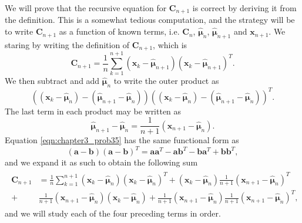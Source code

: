 \documentclass[12pt, a4paper]{article}
\newcommand{\vect}[1]{\bm{#1}}
\begin{document}
\begin{easylist}[enumerate]
We will prove that the recursive equation for $\vect{C}_{n+1}$ is correct by deriving it from the definition.
This is a somewhat tedious computation, and the strategy will be to write $\vect{C}_{n+1}$ as a function of known terms, i.e. $\vect{C}_{n}$, $\hat{\vect{\mu}}_n$, $\hat{\vect{\mu}}_{n+1}$ and $\vect{x}_{n+1}$.
We staring by writing the definition of $\vect{C}_{n+1}$, which is
\begin{equation*}
	\vect{C}_{n+1} = \frac{1}{n} \sum_{k=1}^{n+1} \left( \vect{x}_k - \hat{\vect{\mu}}_{n+1}\right) \left( \vect{x}_k - \hat{\vect{\mu}}_{n+1}\right)^T.
\end{equation*}
We then subtract and add $\hat{\vect{\mu}}_{n}$ to write the outer product as
\begin{equation}
\label{eqn:chapter3_prob35}
	\left( 
	\left( \vect{x}_k - \hat{\vect{\mu}}_{n}\right)
	- 
	\left( \hat{\vect{\mu}}_{n+1} - \hat{\vect{\mu}}_{n} \right)
	\right) 
	\left( 
	\left( \vect{x}_k - \hat{\vect{\mu}}_{n}\right)
	- 
	\left( \hat{\vect{\mu}}_{n+1} - \hat{\vect{\mu}}_{n} \right)
	\right) ^T.
\end{equation}
The last term in each product may be written as
\begin{equation*}
	\hat{\vect{\mu}}_{n+1} - \hat{\vect{\mu}}_{n} = \frac{1}{n +1} \left( \vect{x}_{n+1} -  \hat{\vect{\mu}}_{n} \right).
\end{equation*}
Equation \eqref{eqn:chapter3_prob35} has the same functional form as 
\begin{equation*}
(\vect{a} - \vect{b}) (\vect{a} - \vect{b})^T = \vect{a} \vect{a}^T - \vect{a} \vect{b}^T - \vect{b}\vect{a}^T + \vect{b} \vect{b}^T,
\end{equation*}
and we expand it as such to obtain the following sum
\begin{align}
\begin{split}
\label{eqn:eq3_problem35_2}
\vect{C}_{n+1} &= \frac{1}{n} \sum_{k=1}^{n+1}  
 \left( \vect{x}_k  - \hat{\vect{\mu}}_n \right)\left( \vect{x}_k  - \hat{\vect{\mu}}_n \right)^T 
+  \left( \vect{x}_{k}  - \hat{\vect{\mu}}_n \right) \frac{1}{n+1}\left( \vect{x}_{n+1} - \hat{\vect{\mu}}_n \right)^T \\
+ &   \frac{1}{n+1}\left( \vect{x}_{n+1} - \hat{\vect{\mu}}_n \right)   \left( \vect{x}_k  - \hat{\vect{\mu}}_n \right) 
+  \frac{1}{n+1}\left( \vect{x}_{n+1} - \hat{\vect{\mu}}_n \right) \frac{1}{n+1}\left( \vect{x}_{n+1} - \hat{\vect{\mu}}_n \right)^T,
\end{split}
\end{align}
and we will study each of the four preceding terms in order.


\end{easylist}
\end{document}
